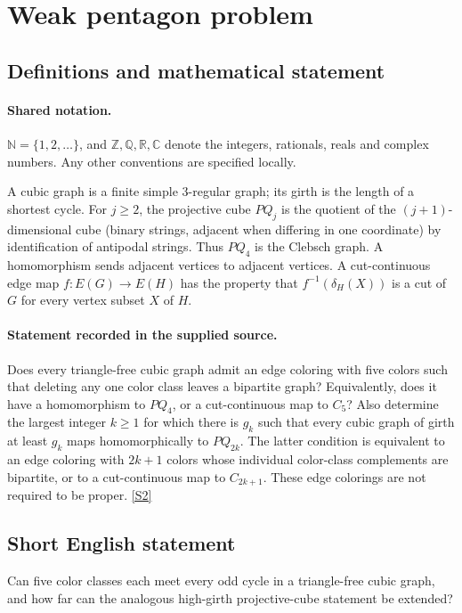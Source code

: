 \documentclass[11pt]{article}
\newcommand{\sref}[2]{\hyperlink{source:#1:#2}{[S#2]}}
\begin{document}
\section{Weak pentagon problem}\label{statement}

\subsection{Definitions and mathematical statement}

\paragraph{Shared notation.}$\mathbb N=\{1,2,\ldots\}$, and $\mathbb Z,\mathbb Q,\mathbb R,\mathbb C$ denote the integers, rationals, reals and complex numbers. Any other conventions are specified locally.


A cubic graph is a finite simple $3$-regular graph; its girth is the length of a shortest cycle. For $j\ge2$, the projective cube $PQ_j$ is the quotient of the $(j+1)$-dimensional cube (binary strings, adjacent when differing in one coordinate) by identification of antipodal strings. Thus $PQ_4$ is the Clebsch graph. A homomorphism sends adjacent vertices to adjacent vertices. A cut-continuous edge map $f:E(G)\to E(H)$ has the property that $f^{-1}(\delta_H(X))$ is a cut of $G$ for every vertex subset $X$ of $H$.
\paragraph{Statement recorded in the supplied source.}
Does every triangle-free cubic graph admit an edge coloring with five colors such that deleting any one color class leaves a bipartite graph? Equivalently, does it have a homomorphism to $PQ_4$, or a cut-continuous map to $C_5$? Also determine the largest integer $k\ge1$ for which there is $g_k$ such that every cubic graph of girth at least $g_k$ maps homomorphically to $PQ_{2k}$. The latter condition is equivalent to an edge coloring with $2k+1$ colors whose individual color-class complements are bipartite, or to a cut-continuous map to $C_{2k+1}$. These edge colorings are not required to be proper. \sref{statement}{2}
\subsection{Short English statement}
Can five color classes each meet every odd cycle in a triangle-free cubic graph, and how far can the analogous high-girth projective-cube statement be extended?
\end{document}

